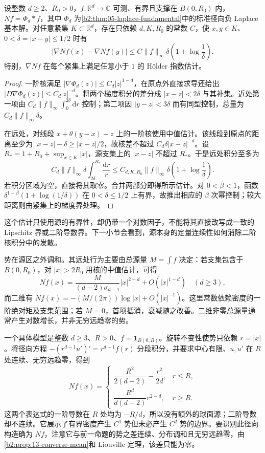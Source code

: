 \begin{proposition}[有界源的梯度连续性]\label{b2:prop:13-newton-gradient-modulus}
设整数 \(d\geq2\)、\(R_0>0\)，\(f:\mathbb R^d\to\mathbb C\) 可测、有界且支撑在 \(B(0,R_0)\) 内，\(Nf=\Phi_d*f\)，其中 \(\Phi_d\) 为\cref{b2:thm:05-laplace-fundamental}中的标准径向负 Laplace 基本解。对任意紧集 \(K\subset\mathbb R^d\)，存在只依赖 \(d,K,R_0\) 的常数 \(C\)，使 \(x,y\in K\)、\(0<\delta=|x-y|\leq1/2\) 时有
\[
 |\nabla Nf(x)-\nabla Nf(y)|
 \leq C\|f\|_\infty\delta\left(1+\log\dfrac1\delta\right).
\]
特别，\(\nabla Nf\) 在每个紧集上满足任意小于 \(1\) 的 Hölder 指数估计。
\end{proposition}
\begin{proof}
一阶核满足 \(|\nabla\Phi_d(z)|\leq C_d|z|^{1-d}\)，在原点外直接求导还给出 \(|D\nabla\Phi_d(z)|\leq C_d|z|^{-d}\)。将两个梯度积分的差分成 \(|x-z|<2\delta\) 与其补集。近处第一项由
\(C_d\|f\|_\infty\int_0^{2\delta}\mathrm{d}r\) 控制；第二项因 \(|y-z|<3\delta\) 而有同型控制，总量为 \(C_d\|f\|_\infty\delta\)。

在远处，对线段 \(x+\theta(y-x)-z\) 上的一阶核使用中值估计。该线段到原点的距离至少为 \(|x-z|-\delta\geq|x-z|/2\)，故核差不超过 \(C_d\delta|x-z|^{-d}\)。设 \(R_*=1+R_0+\sup_{x\in K}|x|\)，源支集上的 \(|x-z|\) 不超过 \(R_*\)。于是远处积分至多为
\[
 C_d\|f\|_\infty\delta\int_{2\delta}^{R_*}\dfrac{\mathrm{d}r}{r}
 \leq C_{d,K,R_0}\|f\|_\infty\delta\left(1+\log\dfrac1\delta\right).
\]
若积分区域为空，直接将其取零。合并两部分即得所示估计。对 \(0<\beta<1\)，函数 \(\delta^{1-\beta}(1+\log(1/\delta))\) 在 \(0<\delta\leq1/2\) 上有界，故推出相应的 \(\beta\) 次幂控制；较大距离则由紧集上的梯度界处理。
\end{proof}

这个估计只使用源的有界性，却仍带一个对数因子，不能将其直接改写成一致的 Lipschitz 界或二阶导数界。下一小节会看到，源本身的定量连续性如何消除二阶核积分中的发散。

\ProseParagraphBreak

势在源区之外调和。其远处行为主要由总源量 \(M=\int f\) 决定：若支集包含于 \(B(0,R_0)\)，对 \(|x|>2R_0\) 用核的中值估计，可得
\[
 Nf(x)=\dfrac{M}{(d-2)\sigma_{d-1}}|x|^{2-d}+O(|x|^{1-d})\quad(d\geq3),
\]
而二维有 \(Nf(x)=-(M/(2\pi))\log|x|+O(|x|^{-1})\)。这里常数依赖密度的一阶绝对矩及支集范围；若 \(M=0\)，首项抵消，衰减随之改善。二维非零总源量通常产生对数增长，并非无穷远趋零的势。

\ProseParagraphBreak

一个具体模型是整数 \(d\geq3\)、\(R>0\)、\(f=\mathbf1_{B(0,R)}\)。旋转不变性使势只依赖 \(r=|x|\)。将径向方程 \(-(r^{d-1}u')'=r^{d-1}f(r)\) 分段积分，并要求中心有限、\(u,u'\) 在 \(R\) 处连续、无穷远趋零，得到
\[
 Nf(x)=
 \begin{cases}
 \dfrac{R^2}{2(d-2)}-\dfrac{r^2}{2d},&r\leq R,\\[4pt]
 \dfrac{R^d}{d(d-2)}r^{2-d},&r\geq R.
 \end{cases}
\]
这两个表达式的一阶导数在 \(R\) 处均为 \(-R/d\)，所以没有额外的球面源；二阶导数却不连续。它展示了有界密度产生 \(C^1\) 势但未必产生 \(C^2\) 势的边界。要识别此径向构造确为 \(Nf\)，注意它与前一命题的势之差连续、分布调和且无穷远趋零，由\cref{b2:prop:13-converse-mean}和 Liouville 定理，该差只能为零。

